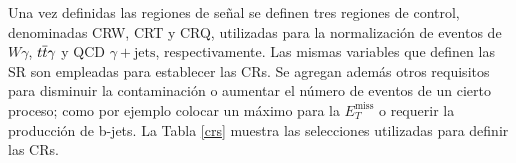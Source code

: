 Una vez definidas las regiones de señal se definen tres regiones de control, denominadas CRW, CRT y CRQ, utilizadas para la normalización de eventos de $W\gamma$, $t \overline{t}\gamma$ y QCD $\gamma + \text{jets}$, respectivamente. Las mismas variables que definen las SR son empleadas para establecer las CRs. Se agregan además otros requisitos para disminuir la contaminación o aumentar el número de eventos de un cierto proceso; como por ejemplo colocar un máximo para la $E_{T}^{\text{miss}}$ o requerir la producción de b-jets. La Tabla \ref{crs} muestra las selecciones utilizadas para definir las CRs.

\begin{table}
\centering
\caption{Criterios de selección para las CRs basadas en las SRs. Los valores de CRW y CRT son los mismos para ambas regiones de señal.}
\label{crs}
\end{table}


